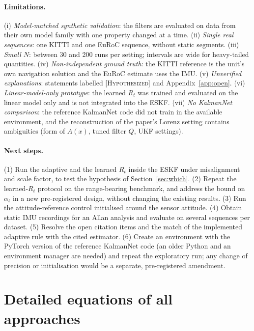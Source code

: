 \documentclass[11pt,a4paper]{article}
\newcommand{\hyp}{\textsc{[Hypothesized]}}
\begin{document}
\paragraph{Limitations.}
(i) \emph{Model-matched synthetic validation}: the filters are evaluated on data from their own model
family with one property changed at a time. (ii) \emph{Single real sequences}: one KITTI and one
EuRoC sequence, without static segments. (iii) \emph{Small $N$}: between 30 and 200 runs per
setting; intervals are wide for heavy-tailed quantities. (iv) \emph{Non-independent ground truth}:
the KITTI reference is the unit's own navigation solution and the EuRoC estimate uses the IMU.
(v) \emph{Unverified explanations}: statements labelled \hyp{} and Appendix~\ref{app:open}.
(vi) \emph{Linear-model-only prototype}: the learned $R_t$ was trained and evaluated on the linear
model only and is not integrated into the ESKF. (vii) \emph{No KalmanNet comparison}: the reference
KalmanNet code did not train in the available environment, and the reconstruction of the paper's
Lorenz setting contains ambiguities (form of $A(x)$, tuned filter $Q$, UKF settings).

\paragraph{Next steps.}
(1) Run the adaptive and the learned $R_t$ inside the ESKF under misalignment and scale factor, to
test the hypothesis of Section~\ref{sec:which}. (2) Repeat the learned-$R_t$ protocol on the
range-bearing benchmark, and address the bound on $\alpha_t$ in a new pre-registered design, without
changing the existing results. (3) Run the attitude-reference control initialised around the sensor
attitude. (4) Obtain static IMU recordings for an Allan analysis \citep{allan1966} and evaluate on
several sequences per dataset. (5) Resolve the open citation items and the match of the implemented
adaptive rule with the cited estimator. (6) Create an environment with the PyTorch version of the
reference KalmanNet code (an older Python and an environment manager are needed) and repeat the
exploratory run; any change of precision or initialisation would be a separate, pre-registered
amendment.




\clearpage
\appendix
\section{Detailed equations of all approaches}\label{app:equations}
\end{document}
